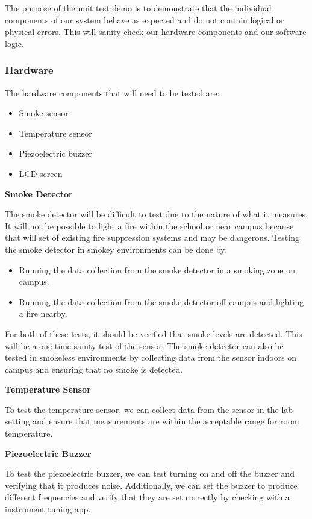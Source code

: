 The purpose of the unit test demo is to demonstrate that the individual components of our system behave as expected and
do not contain logical or physical errors. This will sanity check our hardware components and our software logic.

\subsubsection{Hardware}

The hardware components that will need to be tested are:

\begin{itemize}
    \item Smoke sensor
    \item Temperature sensor
    \item Piezoelectric buzzer
    \item LCD screen
\end{itemize}

\textbf{Smoke Detector}

The smoke detector will be difficult to test due to the nature of what it measures. It will not be possible to light a
fire within the school or near campus because that will set of existing fire suppression systems and may be dangerous.
Testing the smoke detector in smokey environments can be done by:

\begin{itemize}
    \item Running the data collection from the smoke detector in a smoking zone on campus.
    \item Running the data collection from the smoke detector off campus and lighting a fire nearby.
\end{itemize}

For both of these tests, it should be verified that smoke levels are detected. This will be a one-time sanity test of
the sensor. The smoke detector can also be tested in smokeless environments by collecting data from the sensor indoors
on campus and ensuring that no smoke is detected.

\textbf{Temperature Sensor}

To test the temperature sensor, we can collect data from the sensor in the lab setting and ensure that measurements are
within the acceptable range for room temperature.

\textbf{Piezoelectric Buzzer}

To test the piezoelectric buzzer, we can test turning on and off the buzzer and verifying that it produces noise.
Additionally, we can set the buzzer to produce different frequencies and verify that they are set correctly by checking
with a instrument tuning app.

